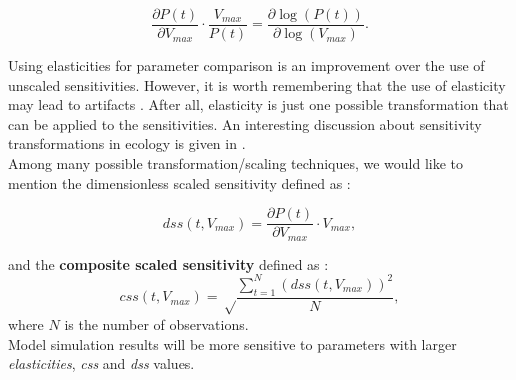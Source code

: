 \begin{equation}
\frac{\partial P(t)}{\partial V_{max}} \cdot \frac{V_{max}}{P(t)} = \frac{\partial \log(P(t))}{\partial\log(V_{max})}.
\end{equation}

Using elasticities for parameter comparison is an improvement over the use of unscaled sensitivities. However, it is worth remembering that the use of elasticity may lead to artifacts \cite{scale}. After all, elasticity is just one possible transformation that can be applied to the sensitivities. An interesting discussion about sensitivity transformations in ecology is given in \cite{scale}. \\
Among many possible transformation/scaling techniques, we would like to mention the dimensionless scaled sensitivity defined as \cite{calib}:

\begin{equation}
dss(t, V_{max}) = \frac{\partial P(t)}{\partial V_{max}} \cdot V_{max},
\end{equation}

and the \textbf{composite scaled sensitivity} defined as \cite{calib}:
\begin{equation}
css(t,V_{max}) = \sqrt \frac{\sum_{t=1}^N \left(dss(t,V_{max})\right)^2}{N},
\end{equation}
where $N$ is the number of observations.\\
Model simulation results will be more sensitive to parameters with larger \textit{elasticities}, \textit{css} and \textit{dss} values.\\
%
%



